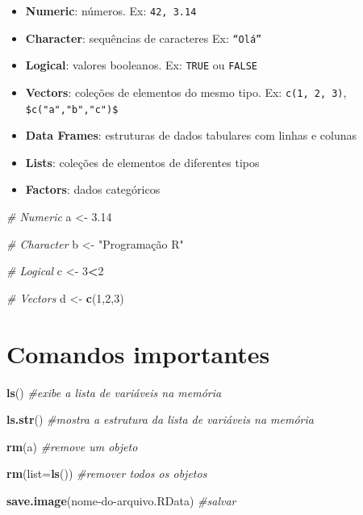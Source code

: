 \documentclass[
]{book}
\newenvironment{Shaded}{\begin{snugshade}}{\end{snugshade}}
\newcommand{\AttributeTok}[1]{\textcolor[rgb]{0.13,0.29,0.53}{#1}}
\newcommand{\CommentTok}[1]{\textcolor[rgb]{0.56,0.35,0.01}{\textit{#1}}}
\newcommand{\DecValTok}[1]{\textcolor[rgb]{0.00,0.00,0.81}{#1}}
\newcommand{\FloatTok}[1]{\textcolor[rgb]{0.00,0.00,0.81}{#1}}
\newcommand{\FunctionTok}[1]{\textcolor[rgb]{0.13,0.29,0.53}{\textbf{#1}}}
\newcommand{\NormalTok}[1]{#1}
\newcommand{\OtherTok}[1]{\textcolor[rgb]{0.56,0.35,0.01}{#1}}
\newcommand{\SpecialCharTok}[1]{\textcolor[rgb]{0.81,0.36,0.00}{\textbf{#1}}}
\newcommand{\StringTok}[1]{\textcolor[rgb]{0.31,0.60,0.02}{#1}}
\begin{document}
\begin{itemize}
\item
  \textbf{Numeric}: números. Ex: \texttt{42,\ 3.14}
\item
  \textbf{Character}: sequências de caracteres Ex: \texttt{“Olá”}
\item
  \textbf{Logical}: valores booleanos. Ex: \texttt{TRUE} ou \texttt{FALSE}
\item
  \textbf{Vectors}: coleções de elementos do mesmo tipo. Ex: \texttt{c(1,\ 2,\ 3)}, \texttt{\$c("a","b","c")\$}
\item
  \textbf{Data Frames}: estruturas de dados tabulares com linhas e colunas
\item
  \textbf{Lists}: coleções de elementos de diferentes tipos
\item
  \textbf{Factors}: dados categóricos
\end{itemize}

\begin{Shaded}
\begin{Highlighting}[]
\CommentTok{\# Numeric}
\NormalTok{a }\OtherTok{\textless{}{-}} \FloatTok{3.14}

\CommentTok{\# Character}
\NormalTok{b }\OtherTok{\textless{}{-}} \StringTok{"Programação R"}

\CommentTok{\# Logical}
\NormalTok{c }\OtherTok{\textless{}{-}} \DecValTok{3}\SpecialCharTok{\textless{}}\DecValTok{2}

\CommentTok{\# Vectors}
\NormalTok{d }\OtherTok{\textless{}{-}} \FunctionTok{c}\NormalTok{(}\DecValTok{1}\NormalTok{,}\DecValTok{2}\NormalTok{,}\DecValTok{3}\NormalTok{)}
\end{Highlighting}
\end{Shaded}

\section{Comandos importantes}\label{comandos-importantes}

\begin{Shaded}
\begin{Highlighting}[]
\FunctionTok{ls}\NormalTok{() }\CommentTok{\#exibe a lista de variáveis na memória}
    
\FunctionTok{ls.str}\NormalTok{() }\CommentTok{\#mostra a estrutura da lista de variáveis na memória}
    
\FunctionTok{rm}\NormalTok{(a) }\CommentTok{\#remove um objeto}
    
\FunctionTok{rm}\NormalTok{(}\AttributeTok{list=}\FunctionTok{ls}\NormalTok{()) }\CommentTok{\#remover todos os objetos}
    
\FunctionTok{save.image}\NormalTok{(}\StringTok{\textquotesingle{}nome{-}do{-}arquivo.RData\textquotesingle{}}\NormalTok{) }\CommentTok{\#salvar}
\end{Highlighting}
\end{Shaded}
\end{document}
